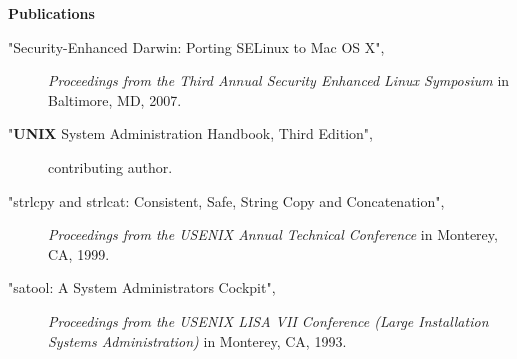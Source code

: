 \documentclass[a4paper,11pt]{article}
\newcommand{\resheading}[1]{{\large \colorbox{mygrey}{\begin{minipage}{\textwidth}{\textbf{#1 \vphantom{p\^{E}}}}\end{minipage}}}}
\begin{document}
\resheading{Publications}

\begin{description}
\item["Security-Enhanced Darwin: Porting SELinux to Mac OS X",]
\emph{Proceedings from the Third Annual Security Enhanced Linux Symposium} in Baltimore, MD, 2007.
\item["{\sc \bf UNIX} System Administration Handbook, Third Edition",]
contributing author.
\item["strlcpy and strlcat:  Consistent, Safe, String Copy and Concatenation",]
\emph{Proceedings from the USENIX Annual Technical Conference} in Monterey, CA, 1999.
\item["satool:  A System Administrators Cockpit",]
\emph{Proceedings from the USENIX LISA VII Conference (Large Installation Systems Administration)} in Monterey, CA, 1993.
\end{description}
\end{document}
